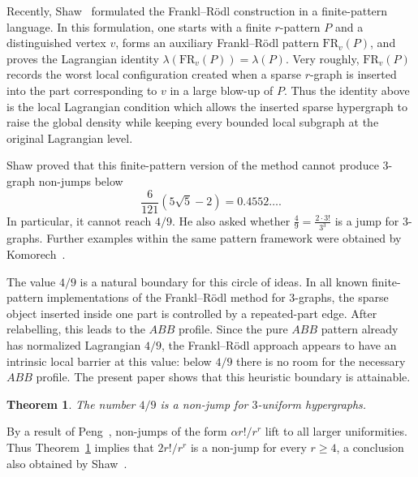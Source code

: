 \documentclass[10pt]{article}
\numberwithin{equation}{section}
\newtheorem{theorem}{Theorem}[section]
\theoremstyle{definition}
\theoremstyle{remark}
\begin{document}
Recently, Shaw~\cite{Shaw2025MinimalNonJumps} formulated the Frankl--R\"odl construction in a finite-pattern language.  In this formulation, one starts with a finite $r$-pattern $P$ and a distinguished vertex $v$, forms an auxiliary Frankl--R\"odl pattern $\mathrm{FR}_v(P)$, and proves the Lagrangian identity $\lambda(\mathrm{FR}_v(P))=\lambda(P)$. 
Very roughly, $\mathrm{FR}_v(P)$ records the worst local configuration created when a sparse $r$-graph is inserted into the part corresponding to $v$ in a large blow-up of $P$. Thus the identity above is the local Lagrangian condition which allows the inserted sparse hypergraph to raise the global density while keeping every bounded local subgraph at the original Lagrangian level.

Shaw proved that this finite-pattern version of the method cannot produce $3$-graph non-jumps below
\[
        \frac{6}{121}\left( 5\sqrt5-2 \right)=0.4552\ldots.
\]
In particular, it cannot reach $4/9$.  He also asked whether $\frac49=\frac{2\cdot 3!}{3^3}$ is a jump for $3$-graphs.  Further examples within the same pattern framework were obtained by Komorech~\cite{Komorech2025NonJumps}.

The value $4/9$ is a natural boundary for this circle of ideas. In all known finite-pattern implementations of the Frankl--R\"{o}dl method for $3$-graphs, the sparse object inserted inside one part is controlled by a repeated-part edge. After relabelling, this leads to the $ABB$ profile.
Since the pure $ABB$ pattern already has normalized Lagrangian $4/9$, the Frankl--R\"odl approach appears to have an intrinsic local barrier at this value: below $4/9$ there is no room for the necessary $ABB$ profile.  The present paper shows that this heuristic boundary is attainable.

\begin{theorem}\label{thm:main}
    The number $4/9$ is a non-jump for $3$-uniform hypergraphs.
\end{theorem}

By a result of Peng~\cite{Peng08LagrangiansI}, non-jumps of the form $\alpha r!/r^r$ lift to all larger uniformities.  Thus Theorem~\ref{thm:main} implies that $2r!/r^r$ is a non-jump for every $r\ge4$, a conclusion also obtained by Shaw~\cite{Shaw2025MinimalNonJumps}.
\end{document}

